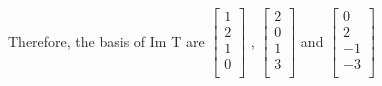 \documentclass[12pt]{article}
\newcommand\tab[1][1cm]{\hspace*{#1}}
\begin{document}
\noindent \tab  Therefore, the basis of Im T are 
$\left[ \begin{array}{c}
  1\\
  2\\  
  1\\ 
  0\\ 
  \end{array} \right] $
,
$\left[ \begin{array}{c}
  2\\
  0\\  
  1\\ 
  3\\ 
  \end{array} \right] $
and 
$\left[ \begin{array}{c}
  0\\
  2\\  
  -1\\ 
  -3\\ 
  \end{array} \right] $



 
\end{document}
